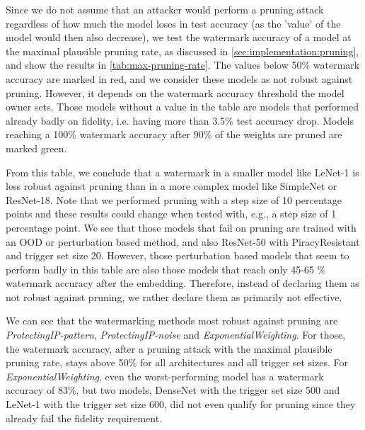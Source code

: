 


Since we do not assume that an attacker would perform a pruning attack regardless of how much the model loses in test accuracy (as the 'value' of the model would then also decrease), we test the watermark accuracy of a model at the maximal plausible pruning rate, as discussed in \cref{sec:implementation:pruning}, and show the results in \cref{tab:max-pruning-rate}. The values below 50\% watermark accuracy are marked in red, and we consider these models as not robust against pruning. However, it depends on the watermark accuracy threshold the model owner sets. Those models without a value in the table are models that performed already badly on fidelity, i.e. having more than 3.5\% test accuracy drop. Models reaching a 100\% watermark accuracy after 90\% of the weights are pruned are marked green.

From this table, we conclude that a watermark in a smaller model like LeNet-1 is less robust against pruning than in a more complex model like SimpleNet or ResNet-18. Note that we performed pruning with a step size of 10 percentage points and these results could change when tested with, e.g., a step size of 1 percentage point. We see that those models that fail on pruning are trained with an OOD or perturbation based method, and also ResNet-50 with PiracyResistant and trigger set size 20. However, those perturbation based models that seem to perform badly in this table are also those models that reach only 45-65 \% watermark accuracy after the embedding.
Therefore, instead of declaring them as not robust against pruning, we rather declare them as primarily not effective.

We can see that the watermarking methods most robust against pruning are \textit{ProtectingIP-pattern}, \textit{ProtectingIP-noise} and \textit{ExponentialWeighting}. For those, the watermark accuracy, after a pruning attack with the maximal plausible pruning rate, stays above 50\% for all architectures and all trigger set sizes. For \textit{ExponentialWeighting}, even the worst-performing model has a watermark accuracy of 83\%, but two models, DenseNet with the trigger set size 500 and LeNet-1 with the trigger set size 600, did not even qualify for pruning since they already fail the fidelity requirement.

\clearpage

